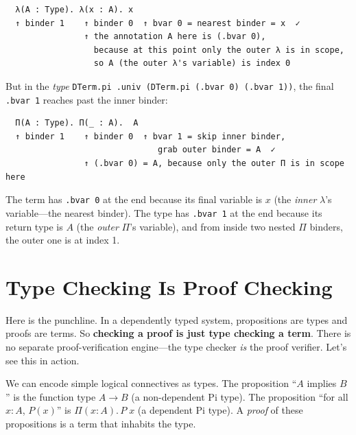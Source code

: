 \documentclass[11pt,a4paper]{article}
\theoremstyle{definition}
\begin{document}
\begin{verbatim}
  λ(A : Type). λ(x : A). x
  ↑ binder 1    ↑ binder 0  ↑ bvar 0 = nearest binder = x  ✓
                ↑ the annotation A here is (.bvar 0),
                  because at this point only the outer λ is in scope,
                  so A (the outer λ's variable) is index 0
\end{verbatim}

But in the \emph{type} \texttt{DTerm.pi .univ (DTerm.pi (.bvar 0) (.bvar 1))},
the final \texttt{.bvar 1} reaches past the inner binder:

\begin{verbatim}
  Π(A : Type). Π(_ : A).  A
  ↑ binder 1    ↑ binder 0  ↑ bvar 1 = skip inner binder,
                               grab outer binder = A  ✓
                ↑ (.bvar 0) = A, because only the outer Π is in scope here
\end{verbatim}

The term has \texttt{.bvar 0} at the end because its final variable is
$x$ (the \emph{inner} $\lambda$'s variable---the nearest binder). The type has
\texttt{.bvar 1} at the end because its return type is $A$ (the \emph{outer}
$\Pi$'s variable), and from inside two nested $\Pi$ binders, the outer one is
at index 1.


\section{Type Checking Is Proof Checking}\label{sec:proofcheck-sec}


Here is the punchline. In a dependently typed system, propositions are types
and proofs are terms. So \textbf{checking a proof is just type checking a
term}. There is no separate proof-verification engine---the type checker
\emph{is} the proof verifier. Let's see this in action.

We can encode simple logical connectives as types. The proposition
``$A$ implies $B$'' is the function type $A \to B$ (a non-dependent Pi type).
The proposition ``for all $x : A$, $P(x)$'' is $\Pi(x:A).\, P\;x$ (a
dependent Pi type). A \emph{proof} of these propositions is a term that
inhabits the type.
\end{document}
